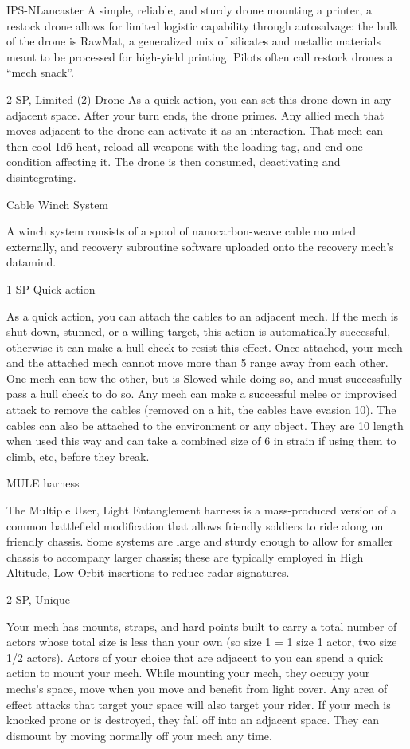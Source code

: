 \begin{mech}{IPS-N}{Lancaster}
A simple, reliable, and sturdy drone mounting a printer, a restock drone allows for limited logistic capability through autosalvage: the bulk of the drone is RawMat, a generalized mix of silicates and metallic materials meant to be processed for high-yield printing. Pilots often call restock drones a “mech snack”.  

2 SP, Limited (2)
Drone
As a quick action, you can set this drone down in any adjacent space. After your turn ends, the drone primes. Any allied mech that moves adjacent to the drone can activate it as an interaction. That mech can then cool 1d6 heat, reload all weapons with the loading tag, and end one condition affecting it. The drone is then consumed, deactivating and disintegrating.


Cable Winch System 

A winch system consists of a spool of nanocarbon-weave cable mounted externally, and recovery subroutine software uploaded onto the recovery mech’s datamind. 

1 SP
Quick action

As a quick action, you can attach the cables to an adjacent mech. If the mech is shut down, stunned, or a willing target, this action is automatically successful, otherwise it can make a hull check to resist this effect. Once attached, your mech and the attached mech cannot move more than 5 range away from each other. One mech can tow the other, but is Slowed while doing so, and must successfully pass a hull check to do so. Any mech can make a successful melee or improvised attack to remove the cables (removed on a hit, the cables have evasion 10). The cables can also be attached to the environment or any object. They are 10 length when used this way and can take a combined size of 6 in strain if using them to climb, etc, before they break.


MULE harness

The Multiple User, Light Entanglement harness is a mass-produced version of a common battlefield modification that allows friendly soldiers to ride along on friendly chassis. Some systems are large and sturdy enough to allow for smaller chassis to accompany larger chassis; these are typically employed in High Altitude, Low Orbit insertions to reduce radar signatures.

2 SP, Unique

Your mech has mounts, straps, and hard points built to carry a total number of actors whose  total size is less than your own (so size 1 = 1 size 1 actor, two size 1/2 actors). Actors of your choice that are adjacent to you can spend a quick action to mount your mech. While mounting your mech, they occupy your mechs’s space, move when you move and benefit from light cover. Any area of effect attacks that target your space will also target your rider. If your mech is knocked prone or is destroyed, they fall off into an adjacent space. They can dismount by moving normally off your mech any time.



\end{mech}
